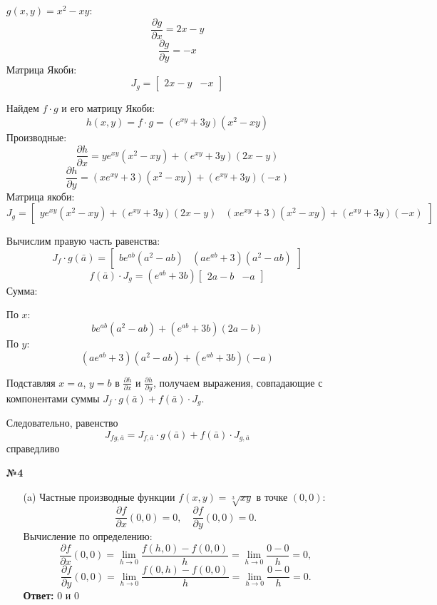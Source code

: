 \documentclass[a4paper]{article}
\begin{document}
\begin{enumerate}
    \( g(x,y) = x^2 - xy \):
    \[ \frac{\partial g}{\partial x} = 2x - y \]
    \[ \frac{\partial g}{\partial y} = -x \]
    Матрица Якоби: \[ J_g = \begin{bmatrix} 2x - y & -x \end{bmatrix} \]

    Найдем \( f \cdot g \) и его матрицу Якоби:
    \[ h(x,y) = f \cdot g = (e^{xy} + 3y)(x^2 - xy) \]
    Производные:
    \[ \frac{\partial h}{\partial x} = y e^{xy}(x^2 - xy) + (e^{xy} + 3y)(2x - y) \]
    \[ \frac{\partial h}{\partial y} = (x e^{xy} + 3)(x^2 - xy) + (e^{xy} + 3y)(-x) \]
    Матрица якоби:
    \[ J_g = \begin{bmatrix} y e^{xy}(x^2 - xy) + (e^{xy} + 3y)(2x - y)&
        (x e^{xy} + 3)(x^2 - xy) + (e^{xy} + 3y)(-x) \end{bmatrix} \]
    
    Вычислим правую часть равенства:
    \[ J_f \cdot g(\bar{a}) = \begin{bmatrix} b e^{ab}(a^2 - ab) & (a e^{ab} + 3)(a^2 - ab) \end{bmatrix} \]
    \[ f(\bar{a}) \cdot J_g = (e^{ab} + 3b) \begin{bmatrix} 2a - b & -a \end{bmatrix} \]
    Сумма:
    
    По \( x \): \[ b e^{ab}(a^2 - ab) + (e^{ab} + 3b)(2a - b) \]
    По \( y \): \[ (a e^{ab} + 3)(a^2 - ab) + (e^{ab} + 3b)(-a) \]

    Подставляя \( x = a \), \( y = b \) в \( \frac{\partial h}{\partial x} \) и \( \frac{\partial h}{\partial y} \), получаем выражения, совпадающие с компонентами суммы \( J_f \cdot g(\bar{a}) + f(\bar{a}) \cdot J_g \).

    Следовательно, равенство \[ J_{fg,\bar{a}} = J_{f,\bar{a}} \cdot g(\bar{a}) + f(\bar{a}) \cdot J_{g,\bar{a}} \] справедливо

    \item[\textbf{№4}]\begin{enumerate}
        \item[(a)]Частные производные функции \( f(x, y) = \sqrt[3]{xy} \) в точке \((0, 0)\):  
        \[
        \frac{\partial f}{\partial x}(0, 0) = 0, \quad \frac{\partial f}{\partial y}(0, 0) = 0.
        \]  
        Вычисление по определению:  
        \[
        \frac{\partial f}{\partial x}(0, 0) = \lim_{h \to 0} \frac{f(h, 0) - f(0, 0)}{h} = \lim_{h \to 0} \frac{0 - 0}{h} = 0,
        \]  
        \[
        \frac{\partial f}{\partial y}(0, 0) = \lim_{h \to 0} \frac{f(0, h) - f(0, 0)}{h} = \lim_{h \to 0} \frac{0 - 0}{h} = 0.
        \]  
        \textbf{Ответ: } $0$ и $0$\\
         

\end{enumerate}
\end{enumerate}
\end{document}
